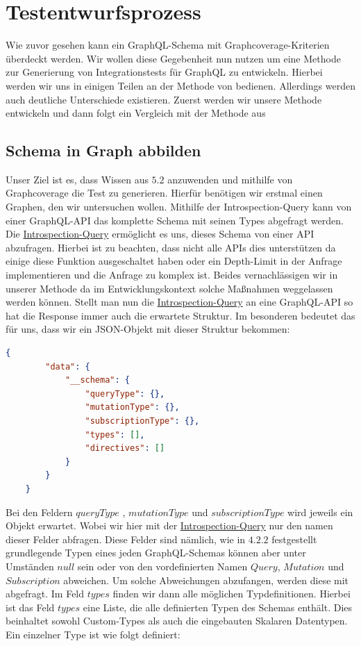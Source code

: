 \chapter{Testentwurfsprozess}

Wie zuvor gesehen kann ein GraphQL-Schema mit Graphcoverage-Kriterien überdeckt werden.
Wir wollen diese Gegebenheit nun nutzen um eine Methode zur Generierung von Integrationstests für GraphQL zu entwickeln.
Hierbei werden wir uns in einigen Teilen an der Methode von \cite[Property-based Testing of GraphQL-APIs]{property-based-testing} bedienen.
Allerdings werden auch deutliche Unterschiede existieren.
Zuerst werden wir unsere Methode entwickeln und dann folgt ein Vergleich mit der Methode aus \cite[Property-based Testing of GraphQL-APIs]{property-based-testing}

\section{Schema in Graph abbilden}

Unser Ziel ist es, dass Wissen aus $5.2$ anzuwenden und mithilfe von Graphcoverage die Test zu generieren.
Hierfür benötigen wir erstmal einen Graphen, den wir untersuchen wollen.
Mithilfe der Introspection-Query kann von einer GraphQL-API das komplette Schema mit seinen Types abgefragt werden.
Die \hyperref[introspection-query]{Introspection-Query} ermöglicht es uns, dieses Schema von einer API abzufragen.
Hierbei ist zu beachten, dass nicht alle APIs dies unterstützen da einige diese Funktion ausgeschaltet haben oder
ein Depth-Limit in der Anfrage implementieren und die Anfrage zu komplex ist.
Beides vernachlässigen wir in unserer Methode da im Entwicklungskontext solche Maßnahmen weggelassen werden können.
Stellt man nun die \hyperref[introspection-query]{Introspection-Query} an eine GraphQL-API so hat die Response immer auch
die erwartete Struktur.
Im besonderen bedeutet das für uns, dass wir ein JSON-Objekt mit dieser Struktur bekommen:

\begin{lstlisting}[language=json, caption={Schema-Response},captionpos=b]
    {
        "data": {
            "__schema": {
                "queryType": {},
                "mutationType": {},
                "subscriptionType": {},
                "types": [],
                "directives": []
            }
        }
    }
\end{lstlisting}

Bei den Feldern $queryType$ , $mutationType$ und $subscriptionType$ wird jeweils ein Objekt erwartet.
Wobei wir hier mit der \hyperref[introspection-query]{Introspection-Query} nur den namen dieser Felder abfragen.
Diese Felder sind nämlich, wie in $4.2.2$ festgestellt grundlegende Typen eines jeden GraphQL-Schemas
können aber unter Umständen $null$ sein oder von den vordefinierten Namen $Query$, $Mutation$ und $Subscription$ abweichen.
Um solche Abweichungen abzufangen, werden diese mit abgefragt.
Im Feld $types$ finden wir dann alle möglichen Typdefinitionen.
Hierbei ist das Feld $types$ eine Liste, die alle definierten Typen des Schemas enthält.
Dies beinhaltet sowohl Custom-Types als auch die eingebauten Skalaren Datentypen.
Ein einzelner Type ist wie folgt definiert:

